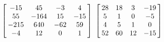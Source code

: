 {$\left[\hskip -3pt \begin{array}{cccc} -15&45&-3&4\\  55&-164&15
&-15\\  -215&640&-62&59\\  -4&12&0&1
\end{array}\hskip -3pt \right] $ 
}
{$ \left[\hskip -3pt \begin{array}{cccc} 28&18&3&-19\\  5&1&0&-5
\\  4&5&1&0\\  52&60&12&-15
\end{array}\hskip -3pt \right]$}
